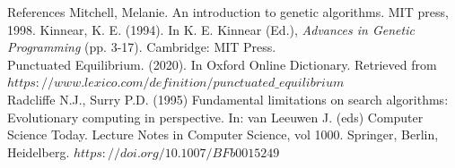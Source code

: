 \documentclass[handout,10pt,aspectratio=169]{beamer}
\begin{document}
\begin{frame}{References}
Mitchell, Melanie. An introduction to genetic algorithms. MIT press, 1998.
\medskip
	Kinnear, K. E. (1994). In K. E. Kinnear (Ed.), \emph{Advances in
	Genetic Programming} (pp. 3-17). Cambridge: MIT Press.\\
	\medskip
	Punctuated Equilibrium. (2020). In Oxford Online Dictionary. Retrieved
	from $https://www.lexico.com/definition/punctuated\_equilibrium$\\
	\medskip
	Radcliffe N.J., Surry P.D. (1995) Fundamental limitations on search
	algorithms: Evolutionary computing in perspective.  In: van Leeuwen
	J. (eds) Computer Science Today. Lecture Notes in Computer Science,
	vol 1000. Springer, Berlin, Heidelberg.
	$https://doi.org/10.1007/BFb0015249$\\
	
\end{frame}








\end{document}
